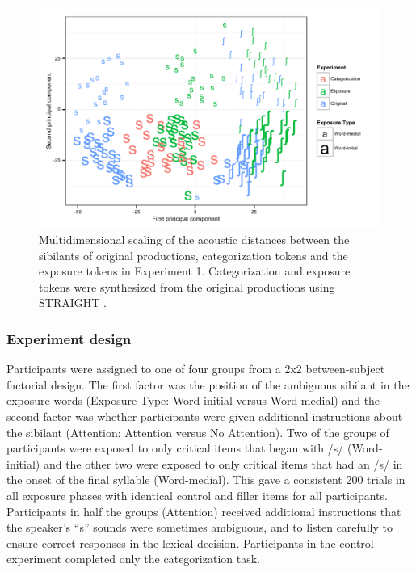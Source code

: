 \begin{figure}[ht]
\caption{Multidimensional scaling of the acoustic distances between the sibilants of original productions, categorization tokens and the exposure tokens in Experiment 1.  Categorization and exposure tokens were synthesized from the original productions using STRAIGHT \citep{Kawahara2008}.}
\label{fig:exp1mds}
\begin{center}
\includegraphics[width=\textwidth]{graphs/exp1_mds}
\end{center}
\end{figure}

\subsubsection{Experiment design}

Participants were assigned to one of four groups from a 2x2 between-subject factorial design.
The first factor was the position of the ambiguous sibilant in the exposure words (Exposure Type: Word-initial versus Word-medial) and the second factor was whether participants were given additional instructions about the sibilant (Attention: Attention versus No Attention).
Two of the groups of participants were exposed to only critical items that began with /s/ (Word-initial) and the other two were exposed to only critical items that had an /s/ in the onset of the final syllable (Word-medial).
This gave a consistent 200 trials in all exposure phases with identical control and filler items for all participants. 
Participants in half the groups (Attention) received additional instructions that the speaker's ``s'' sounds were sometimes ambiguous, and to listen carefully to ensure correct responses in the lexical decision.
Participants in the control experiment completed only the categorization task.


